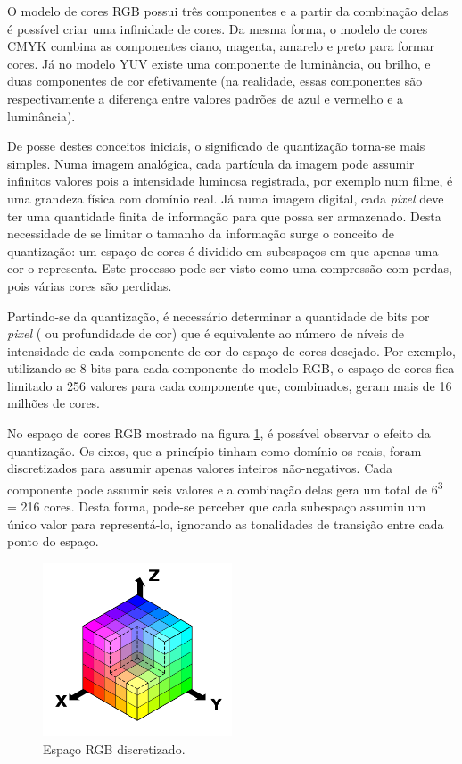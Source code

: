 O modelo de cores RGB possui três componentes e a partir da combinação delas é possível criar uma infinidade de cores. Da mesma forma, o modelo de cores CMYK combina as componentes ciano, magenta, amarelo e preto para formar cores. Já no modelo YUV existe uma componente de luminância, ou brilho, e duas componentes de cor efetivamente (na realidade, essas componentes são respectivamente a diferença entre valores padrões de azul e vermelho e a luminância).

De posse destes conceitos iniciais, o significado de quantização torna-se mais simples. Numa imagem analógica, cada partícula da imagem pode assumir infinitos valores pois a intensidade luminosa registrada, por exemplo num filme, é uma grandeza física com domínio real. Já numa imagem digital, cada \emph{pixel} deve ter uma quantidade finita de informação para que possa ser armazenado. Desta necessidade de se limitar o tamanho da informação surge o conceito de quantização: um espaço de cores é dividido em subespaços em que apenas uma cor o representa. Este processo pode ser visto como uma compressão com perdas, pois várias cores são perdidas.

Partindo-se da quantização, é necessário determinar a quantidade de bits por \emph{pixel} ( ou profundidade de cor) que é equivalente ao número de níveis de intensidade de cada componente de cor do espaço de cores desejado. Por exemplo, utilizando-se 8 bits para cada componente do modelo RGB, o espaço de cores fica limitado a 256 valores para cada componente que, combinados, geram mais de 16 milhões de cores.

No espaço de cores RGB mostrado na figura \ref{fig:rgbdiscrete}, é possível observar o efeito da quantização. Os eixos, que a princípio tinham como domínio os reais, foram discretizados para assumir apenas valores inteiros não-negativos. Cada componente pode assumir seis valores e a combinação delas gera um total de 6\textsuperscript{3} = 216 cores. Desta forma, pode-se perceber que cada subespaço assumiu um único valor para representá-lo, ignorando as tonalidades de transição entre cada ponto do espaço.

\begin{figure}[!htb]
	\centering
	\includegraphics[width=0.5\textwidth]{./imgs/rgbdiscrete.png}
	\caption{Espaço RGB discretizado.}
	\label{fig:rgbdiscrete}
\end{figure}


